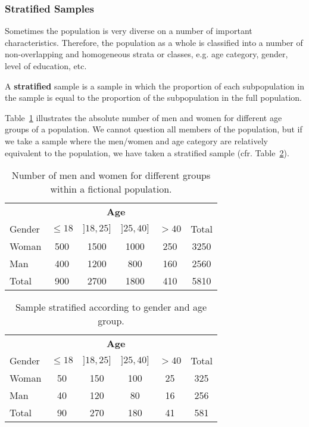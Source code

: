 \subsubsection{Stratified Samples}

Sometimes the population is very diverse on a number of important characteristics. Therefore, the population as a whole is classified into a number of non-overlapping and homogeneous strata or classes, e.g. age category, gender, level of education, etc.

\begin{definition}
    A \textbf{stratified} sample is a sample in which the proportion of each subpopulation in the sample is equal to the proportion of the subpopulation in the full population.
\end{definition}

\begin{example}
    Table~\ref{tab:frequenties-populatie} illustrates the absolute number of men and women for different age groups of a population.
    We cannot question all members of the population, but if we take a sample where the men/women and age category are relatively equivalent to the population, we have taken a stratified sample (cfr. Table~\ref{tab:frequenties-steekproef}).
\end{example}

\begin{table}
    \centering
    \begin{tabular}{l|cccc|c}
        & \multicolumn{4}{c|}{\textbf{Age}} & \\
        Gender & $\le 18$ & $]18,25]$ & $]25, 40]$ & $> 40$ & Total\\
        \hline
        Woman & 500 & 1500 & 1000 & 250 & 3250 \\
        Man   & 400 & 1200 & 800 & 160 & 2560\\
        \hline
        Total & 900 & 2700 & 1800 & 410 & 5810
    \end{tabular}
    \caption{Number of men and women for different groups within a fictional population.}
    \label{tab:frequenties-populatie}
\end{table}

\begin{table}
    \centering
    \begin{tabular}{l|cccc|c}
        & \multicolumn{4}{c|}{\textbf{Age}} & \\
        Gender & $\le 18$ & $]18,25]$ & $]25, 40]$ & $> 40$ & Total\\
        \hline
        Woman & 50 & 150 & 100 & 25 & 325 \\
        Man   & 40 & 120 & 80 & 16 & 256\\
        \hline
        Total & 90 & 270 & 180 & 41 & 581
    \end{tabular}
    \caption{Sample stratified according to gender and age group.}
    \label{tab:frequenties-steekproef}
\end{table}

